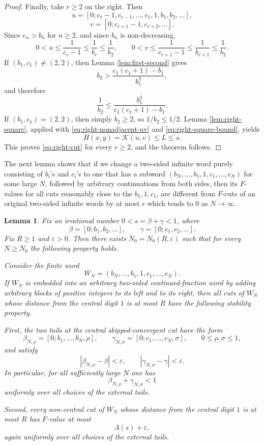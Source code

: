 \documentclass[11pt]{amsart}
\newtheorem{lemma}[theorem]{Lemma}
\newcommand{\Kfun}{\mathcal K}
\begin{document}
\begin{proof}
Finally, take $r\ge2$ on the right.  Then
$$
        u=[0;c_r-1,c_{r-1},\ldots,c_1,1,b_1,b_2,\ldots],
$$
$$
        v=[0;c_{r+1}-1,c_{r+2},\ldots].
$$
Since $c_n>b_n$ for $n\ge2$, and since $b_n$ is non-decreasing,
\begin{equation}\label{eq:right-nonadjacent-uv}
        0<u\le \frac1{c_r-1}\le \frac1{b_r}\le \frac1{b_2},
        \qquad
        0<v\le \frac1{c_{r+1}-1}\le \frac1{b_{r+1}}
        \le \frac1{b_2}.
\end{equation}
If $(b_1,c_1)\ne(2,2)$, then Lemma \ref{lem:first-second} gives
$$
        b_2>
        \frac{c_1(c_1+1)-b_1}{b_1^2},
$$
and therefore
\begin{equation}\label{eq:right-square-bound}
        \frac1{b_2}
        \le
        \frac{b_1^2}{c_1(c_1+1)-b_1}.
\end{equation}
If $(b_1,c_1)=(2,2)$, then simply $b_2\ge2$, so $1/b_2\le1/2$.  Lemma \ref{lem:right-square}, applied with \eqref{eq:right-nonadjacent-uv} and \eqref{eq:right-square-bound}, yields
$$
        H(x,y)=\Kfun(u,v)\le L\le s.
$$
This proves \eqref{eq:right-cut} for every $r\ge2$, and the theorem follows.
\end{proof}

The next lemma shows that if we change a two-sided infinite word purely consisting of $b_i$'s and $c_i$'s to one that has a subword $(b_N,\ldots,b_1,1,c_1,\ldots,c_N)$ for some large $N$, followed by arbitrary continuations from both sides, then its $F$-values for all cuts reasonably close to the $b_1,1,c_1$, are different from $F$-cuts of an original two-sided infinite words by at most $\epsilon$ which tends to $0$ as $N\to\infty$.

\begin{lemma}
\label{lem:finite-window-stability}
Fix an irrational number $0<s=\beta+\gamma<1$, where
$$
        \beta=[0;b_1,b_2,\ldots],
        \qquad
        \gamma=[0;c_1,c_2,\ldots].
$$
Fix $R\ge 1$ and $\varepsilon>0$. Then there exists
$N_0=N_0(R,\varepsilon)$ such that for every $N\ge N_0$ the following property holds.

Consider the finite word
$$
        W_N=(b_N,\ldots,b_1,1,c_1,\ldots,c_N).
$$
If $W_N$ is embedded into an arbitrary two-sided continued-fraction word by adding arbitrary blocks of positive integers to its left and to its right, then all cuts of $W_N$ whose distance from the central digit $1$ is at most $R$ have the following stability property.

First, the two tails at the central skipped-convergent cut have the form
$$
        \beta_{N,\rho}=[0;b_1,\ldots,b_N,\rho],
        \qquad
        \gamma_{N,\sigma}=[0;c_1,\ldots,c_N,\sigma],
        \qquad 0\le \rho,\sigma\le 1,
$$
and satisfy
$$
        |\beta_{N,\rho}-\beta|<\varepsilon,
        \qquad
        |\gamma_{N,\sigma}-\gamma|<\varepsilon.
$$
In particular, for all sufficiently large $N$ one has
$$
        \beta_{N,\rho}+\gamma_{N,\sigma}<1
$$
uniformly over all choices of the external tails.

Second, every non-central cut of $W_N$ whose distance from the central digit $1$ is at most $R$ has $F$-value at most
$$
        \Lambda(s)+\varepsilon,
$$
again uniformly over all choices of the external tails.
\end{lemma}
\end{document}
